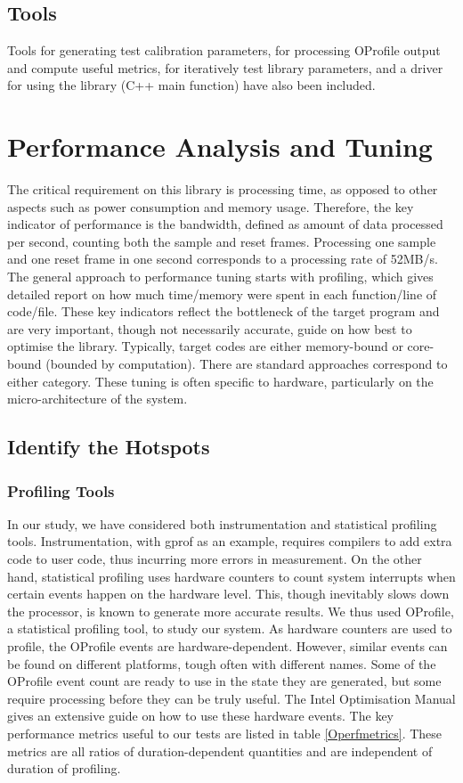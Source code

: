 \documentclass[journal]{IEEEtran}
\begin{document}
\subsection{Tools}
Tools for generating test calibration parameters, for processing OProfile output and compute useful metrics, for iteratively test library parameters, and a driver for using the library (C++ main function) have also been included.

\section{Performance Analysis and Tuning} %
\label{sec:perf}
The critical requirement on this library is processing time, as opposed to other aspects such as power consumption and memory usage. Therefore, the key indicator of performance is the bandwidth, defined as amount of data processed per second, counting both the sample and reset frames. Processing one sample and one reset frame in one second corresponds to a processing rate of 52MB/s. The general approach to performance tuning starts with profiling, which gives detailed report on how much time/memory were spent in each function/line of code/file. These key indicators reflect the bottleneck of the target program and are very important, though not necessarily accurate, guide on how best to optimise the library. Typically, target codes are either memory-bound or core-bound (bounded by computation). There are standard approaches correspond to either category. These tuning is often specific to hardware, particularly on the micro-architecture of the system.
\subsection{Identify the Hotspots}
\subsubsection{Profiling Tools}
In our study, we have considered both instrumentation and statistical profiling tools. Instrumentation, with gprof as an example, requires compilers to add extra code to user code, thus incurring more errors in measurement. On the other hand, statistical profiling uses hardware counters to count system interrupts when certain events happen on the hardware level. This, though inevitably slows down the processor, is known to generate more accurate results. We thus used OProfile, a statistical profiling tool, to study our system. As hardware counters are used to profile, the OProfile events are hardware-dependent. However, similar events can be found on different platforms, tough often with different names. Some of the OProfile event count are ready to use in the state they are generated, but some require processing before they can be truly useful. The Intel Optimisation Manual gives an extensive guide on how to use these hardware events. The key performance metrics useful to our tests are listed in table \ref{Operfmetrics}. These metrics are all ratios of duration-dependent quantities and are independent of duration of profiling. 
\end{document}
